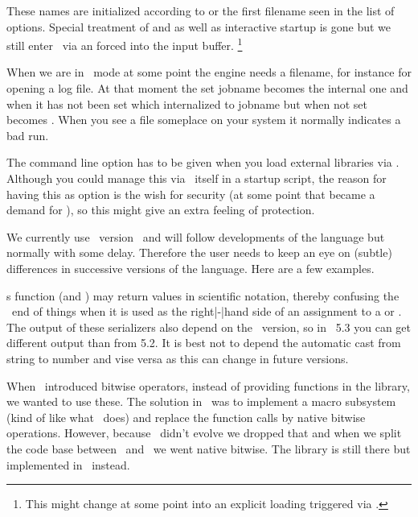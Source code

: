 These names are initialized according to  or the first filename
seen in the list of options. Special treatment of \type {&} and \type {*} as well
as interactive startup is gone but we still enter \TEX\ via an forced \type {}
into the input buffer. \footnote {This might change at some point into an explicit
loading triggered via \LUA.}

When we are in \TEX\ mode at some point the engine needs a filename, for instance
for opening a log file. At that moment the set jobname becomes the internal one
and when it has not been set which internalized to jobname but when not set
becomes . When you see a  file someplace on your
system it normally indicates a bad run.


The command line option  has to be given when you load
external libraries via \LUA. Although you could manage this via \LUA\ itself in a
startup script, the reason for having this as option is the wish for security (at
some point that became a demand for \LUATEX), so this might give an extra feeling
of protection.

\stopsubsection

\stopsection

\startsection[title={\LUA\ behaviour}]

\startsubsection[title={The \LUA\ version}]

We currently use \LUA\ version \luaversion\ and will follow developments of the
language but normally with some delay. Therefore the user needs to keep an eye on
(subtle) differences in successive versions of the language. Here are a few
examples.

\LUA s  function (and ) may return values in
scientific notation, thereby confusing the \TEX\ end of things when it is used as
the right|-|hand side of an assignment to a \type {\dimen} or \type {\count}. The
output of these serializers also depend on the \LUA\ version, so in \LUA\ 5.3 you
can get different output than from 5.2. It is best not to depend the automatic
cast from string to number and vise versa as this can change in future versions.

When \LUA\ introduced bitwise operators, instead of providing functions in the
 library, we wanted to use these. The solution in \CONTEXT\ was to
implement a macro subsystem (kind of like what \CCODE\ does) and replace the
function calls by native bitwise operations. However, because \LUAJITTEX\ didn't
evolve we dropped that and when we split the code base between \MKIV\ and \MKXL\
we went native bitwise. The  library is still there but implemented
in \LUA\ instead.

